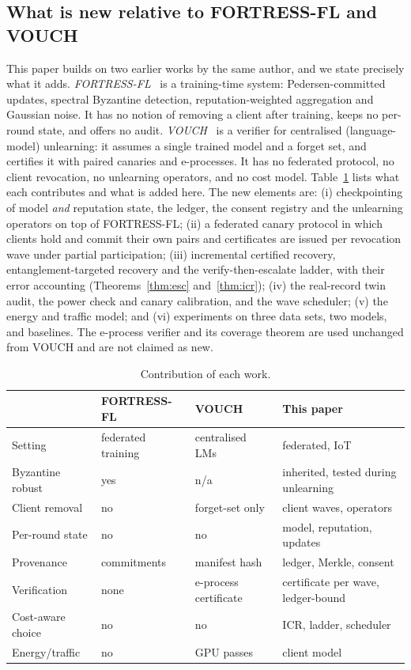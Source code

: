 \documentclass[journal]{IEEEtran}
\newcommand{\ours}{FORTRESS-FL}
\begin{document}
\subsection*{What is new relative to \ours{} and VOUCH}
This paper builds on two earlier works by the same author, and we state precisely what it adds.
\emph{\ours{}}~\cite{dang2026fortress} is a training-time system: Pedersen-committed updates, spectral Byzantine detection, reputation-weighted aggregation and Gaussian noise. It has no notion of removing a client after training, keeps no per-round state, and offers no audit. \emph{VOUCH}~\cite{dang2026vouch} is a verifier for centralised (language-model) unlearning: it assumes a single trained model and a forget set, and certifies it with paired canaries and e-processes. It has no federated protocol, no client revocation, no unlearning operators, and no cost model.
Table~\ref{tab:delta} lists what each contributes and what is added here. The new elements are: (i) checkpointing of model \emph{and} reputation state, the ledger, the consent registry and the unlearning operators on top of \ours{}; (ii) a federated canary protocol in which clients hold and commit their own pairs and certificates are issued per revocation wave under partial participation; (iii) incremental certified recovery, entanglement-targeted recovery and the verify-then-escalate ladder, with their error accounting (Theorems~\ref{thm:esc} and~\ref{thm:icr}); (iv) the real-record twin audit, the power check and canary calibration, and the wave scheduler; (v) the energy and traffic model; and (vi) experiments on three data sets, two models, and baselines. The e-process verifier and its coverage theorem are used unchanged from VOUCH and are not claimed as new.

\begin{table}[t]
\centering
\caption{Contribution of each work.}\label{tab:delta}
\footnotesize
\begin{tabular}{@{}p{1.9cm}p{1.9cm}p{1.9cm}p{1.9cm}@{}}
\toprule
 & \ours{}~\cite{dang2026fortress} & VOUCH~\cite{dang2026vouch} & This paper \\
\midrule
Setting & federated training & centralised LMs & federated, IoT \\
Byzantine robust & yes & n/a & inherited, tested during unlearning \\
Client removal & no & forget-set only & client waves, operators \\
Per-round state & no & no & model, reputation, updates \\
Provenance & commitments & manifest hash & ledger, Merkle, consent \\
Verification & none & e-process certificate & certificate per wave, ledger-bound \\
Cost-aware choice & no & no & ICR, ladder, scheduler \\
Energy/traffic & no & GPU passes & client model \\
\bottomrule
\end{tabular}
\end{table}
\end{document}
